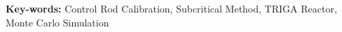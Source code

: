 \begin{tcolorbox}[arc=0pt, boxrule=0pt, colback=cherenkovblue!60, width=\textwidth, colupper=white]
    {\titlesfont\fontsize{10}{10}\textbf{Key-words:}} Control Rod Calibration, Subcritical Method, TRIGA Reactor, Monte Carlo Simulation
\end{tcolorbox}

\vspace{10pt}

\makenomenclature
\renewcommand\nomgroup[1]{%
\item[\bfseries
\ifstrequal{#1}{A}{A Quantities}{%
\ifstrequal{#1}{B}{B Quantities}{}}%
]}

\renewcommand{\nompreamble}{\begin{multicols}{2}}
\renewcommand{\nompostamble}{\end{multicols}}


\vspace{-5pt} %
\printnomenclature
